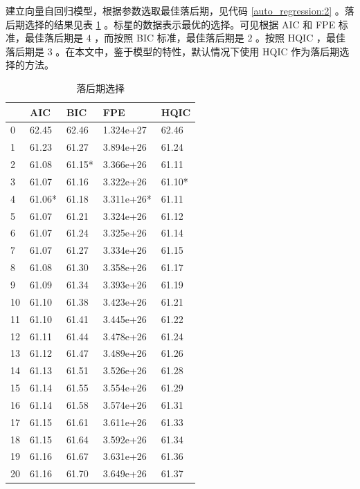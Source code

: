 建立向量自回归模型，根据参数选取最佳落后期，见代码 \ref{auto_regression:2} 。落后期选择的结果见表 \ref{auto_regression:1} 。标星的数据表示最优的选择。可见根据 AIC 和 FPE 标准，最佳落后期是 $4$ ，而按照 BIC 标准，最佳落后期是 $2$ 。按照 HQIC ，最佳落后期是 $3$ 。在本文中，鉴于模型的特性，默认情况下使用 HQIC 作为落后期选择的方法。

\begin{table}
  \centering
  \caption{落后期选择}
  \label{auto_regression:1}
  \begin{tabularx}{0.75\textwidth}{XXXXX}
    \toprule
    & AIC & BIC & FPE & HQIC \\
    \midrule
    0 & 62.45 & 62.46 & 1.324e+27 & 62.46 \\
    1 & 61.23 & 61.27 & 3.894e+26 & 61.24 \\
    2 & 61.08 & 61.15* & 3.366e+26 & 61.11 \\
    3 & 61.07 & 61.16 & 3.322e+26 & 61.10* \\
    4 & 61.06* & 61.18 & 3.311e+26* & 61.11 \\
    5 & 61.07 & 61.21 & 3.324e+26 & 61.12 \\
    6 & 61.07 & 61.24 & 3.325e+26 & 61.14 \\
    7 & 61.07 & 61.27 & 3.334e+26 & 61.15 \\
    8 & 61.08 & 61.30 & 3.358e+26 & 61.17 \\
    9 & 61.09 & 61.34 & 3.393e+26 & 61.19 \\
    10 & 61.10 & 61.38 & 3.423e+26 & 61.21 \\
    11 & 61.10 & 61.41 & 3.445e+26 & 61.22 \\
    12 & 61.11 & 61.44 & 3.478e+26 & 61.24 \\
    13 & 61.12 & 61.47 & 3.489e+26 & 61.26 \\
    14 & 61.13 & 61.51 & 3.526e+26 & 61.28 \\
    15 & 61.14 & 61.55 & 3.554e+26 & 61.29 \\
    16 & 61.14 & 61.58 & 3.574e+26 & 61.31 \\
    17 & 61.15 & 61.61 & 3.611e+26 & 61.33 \\
    18 & 61.15 & 61.64 & 3.592e+26 & 61.34 \\
    19 & 61.16 & 61.67 & 3.631e+26 & 61.36 \\
    20 & 61.16 & 61.70 & 3.649e+26 & 61.37 \\
    \bottomrule
  \end{tabularx}
\end{table}

